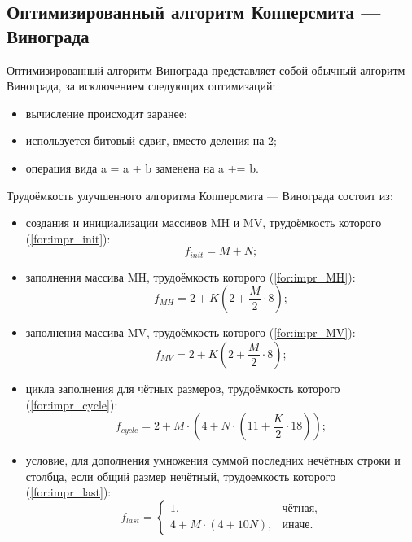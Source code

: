 \subsection{Оптимизированный алгоритм Копперсмита — Винограда}

Оптимизированный алгоритм Винограда представляет собой обычный алгоритм Винограда, за исключением следующих оптимизаций:
\begin{itemize}
	\item вычисление происходит заранее;
	\item используется битовый сдвиг, вместо деления на 2;
	\item операция вида a = a + b заменена на a += b.
\end{itemize}


Трудоёмкость улучшенного алгоритма Копперсмита — Винограда состоит из:
\begin{itemize}
	\item создания и инициализации массивов MH и MV, трудоёмкость которого (\ref{for:impr_init}):
	\begin{equation}
		\label{for:impr_init}
		f_{init} = M + N;
	\end{equation}
	
	\item заполнения массива MH, трудоёмкость которого (\ref{for:impr_MH}):
	\begin{equation}
		\label{for:impr_MH}
		f_{MH} =  2 + K (2 + \frac{M}{2} \cdot 8);
	\end{equation}
	
	\item заполнения массива MV, трудоёмкость которого (\ref{for:impr_MV}):
	\begin{equation}
		\label{for:impr_MV}
		f_{MV} =  2 + K (2 + \frac{M}{2} \cdot 8);
	\end{equation}
	
	\item цикла заполнения для чётных размеров, трудоёмкость которого (\ref{for:impr_cycle}):
	\begin{equation}
		\label{for:impr_cycle}
		f_{cycle} =2 + M \cdot (4 + N \cdot (11 + \frac{K}{2} \cdot 18));
	\end{equation}
	
	\item условие, для дополнения умножения суммой последних нечётных строки и столбца, если общий размер нечётный, трудоемкость которого (\ref{for:impr_last}):
	\begin{equation}
		\label{for:impr_last}
		f_{last} = 
		\begin{cases}
			1, & \text{чётная,}\\
			4 + M \cdot (4 + 10N), & \text{иначе.}
		\end{cases}
	\end{equation}
\end{itemize}

